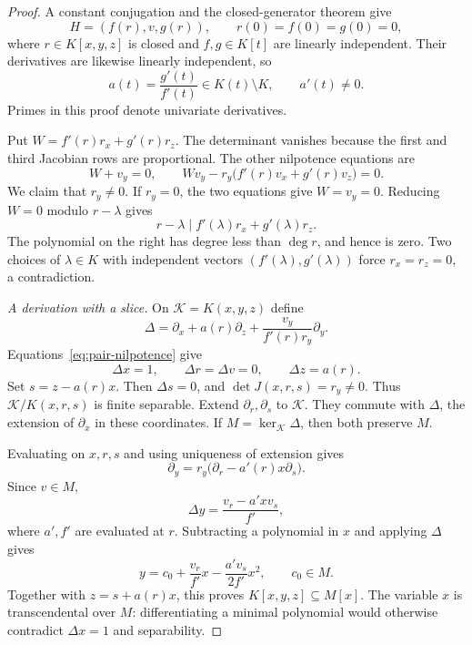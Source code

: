 \begin{proof}
A constant conjugation and the closed-generator theorem give
\begin{equation}\label{eq:pair-form}
 H=(f(r),v,g(r)),\qquad r(0)=f(0)=g(0)=0,
\end{equation}
where $r\in K[x,y,z]$ is closed and $f,g\in K[t]$ are linearly independent. Their derivatives are likewise linearly independent, so
\begin{equation}\label{eq:a-ratio}
 a(t)=\frac{g'(t)}{f'(t)}\in K(t)\setminus K,\qquad a'(t)\neq0.
\end{equation}
Primes in this proof denote univariate derivatives.

Put $W=f'(r)r_x+g'(r)r_z$. The determinant vanishes because the first and third Jacobian rows are proportional. The other nilpotence equations are
\begin{equation}\label{eq:pair-nilpotence}
 W+v_y=0,\qquad Wv_y-r_y\bigl(f'(r)v_x+g'(r)v_z\bigr)=0.
\end{equation}
We claim that $r_y\neq0$. If $r_y=0$, the two equations give $W=v_y=0$. Reducing $W=0$ modulo $r-\lambda$ gives
\[
 r-\lambda\mid f'(\lambda)r_x+g'(\lambda)r_z.
\]
The polynomial on the right has degree less than $\deg r$, and hence is zero. Two choices of $\lambda\in K$ with independent vectors $(f'(\lambda),g'(\lambda))$ force $r_x=r_z=0$, a contradiction.

\smallskip\noindent\emph{A derivation with a slice.}
On $\mathcal K=K(x,y,z)$ define
\begin{equation}\label{eq:delta}
 \Delta=\partial_x+a(r)\partial_z+\frac{v_y}{f'(r)r_y}\partial_y.
\end{equation}
Equations~\eqref{eq:pair-nilpotence} give
\[
 \Delta x=1,\qquad \Delta r=\Delta v=0,\qquad \Delta z=a(r).
\]
Set $s=z-a(r)x$. Then $\Delta s=0$, and $\det J(x,r,s)=r_y\neq0$. Thus $\mathcal K/K(x,r,s)$ is finite separable. Extend $\partial_r,\partial_s$ to $\mathcal K$. They commute with $\Delta$, the extension of $\partial_x$ in these coordinates. If $M=\ker_{\mathcal K}\Delta$, then both preserve $M$.

Evaluating on $x,r,s$ and using uniqueness of extension gives
\begin{equation}\label{eq:dy-identity}
 \partial_y=r_y\bigl(\partial_r-a'(r)x\partial_s\bigr).
\end{equation}
Since $v\in M$,
\[
 \Delta y=\frac{v_r-a'xv_s}{f'},
\]
where $a',f'$ are evaluated at $r$. Subtracting a polynomial in $x$ and applying $\Delta$ gives
\begin{equation}\label{eq:y-polynomial}
 y=c_0+\frac{v_r}{f'}x-\frac{a'v_s}{2f'}x^2,\qquad c_0\in M.
\end{equation}
Together with $z=s+a(r)x$, this proves $K[x,y,z]\subseteq M[x]$. The variable $x$ is transcendental over $M$: differentiating a minimal polynomial would otherwise contradict $\Delta x=1$ and separability.


\end{proof}
